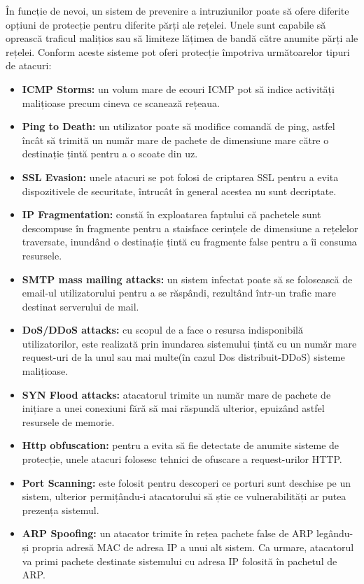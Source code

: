 În funcție de nevoi, un sistem de prevenire a intruziunilor poate să ofere diferite opțiuni de protecție pentru diferite părți ale rețelei. Unele sunt capabile să oprească traficul malițios sau să limiteze lățimea de bandă către anumite părți ale rețelei. Conform \cite{ips_sec_types} aceste sisteme pot oferi protecție împotriva următoarelor tipuri de atacuri: 
\begin{itemize}
	\item \textbf{ICMP Storms:}  un volum mare de ecouri ICMP pot să indice activități malițioase precum cineva ce scanează rețeaua. 
	\item \textbf{Ping to Death:}  un utilizator poate să modifice comandă de ping, astfel încât să trimită un număr mare de pachete de dimensiune mare către o destinație țintă pentru a o scoate din uz. 
	\item \textbf{SSL Evasion:}  unele atacuri se pot folosi de criptarea SSL pentru a evita dispozitivele de securitate, întrucât în general acestea nu sunt decriptate. 
	\item \textbf{IP Fragmentation:}  constă în exploatarea faptului că pachetele sunt descompuse în fragmente pentru a staisface cerințele de dimensiune a rețelelor traversate, inundând o destinație țintă cu fragmente false pentru a îi consuma resursele.  
	\item \textbf{SMTP mass mailing attacks:}  un sistem infectat poate să se folosească de email-ul utilizatorului pentru a se răspândi, rezultând într-un trafic mare destinat serverului de mail. 
	\item \textbf{DoS/DDoS attacks:} cu scopul de a face o resursa indisponibilă utilizatorilor, este realizată prin inundarea sistemului țintă cu un număr mare request-uri de la unul sau mai multe(în cazul Dos distribuit-DDoS) sisteme malițioase. 
	\item \textbf{SYN Flood attacks:}  atacatorul trimite un număr mare de pachete de inițiare a unei conexiuni fără să mai răspundă ulterior, epuizând astfel resursele de memorie. 
	\item \textbf{Http obfuscation:}  pentru a evita să fie detectate de anumite sisteme de protecție, unele atacuri folosesc tehnici de ofuscare a request-urilor HTTP. 
	\item \textbf{Port Scanning:}  este folosit pentru descoperi ce porturi sunt deschise pe un sistem, ulterior permițându-i atacatorului să știe ce vulnerabilități ar putea prezența sistemul. 
	\item \textbf{ARP Spoofing:}  un atacator trimite în rețea pachete false de ARP legându-și propria adresă MAC de adresa IP a unui alt sistem. Ca urmare, atacatorul va primi pachete destinate sistemului cu adresa IP folosită în pachetul de ARP. 

\end{itemize}
